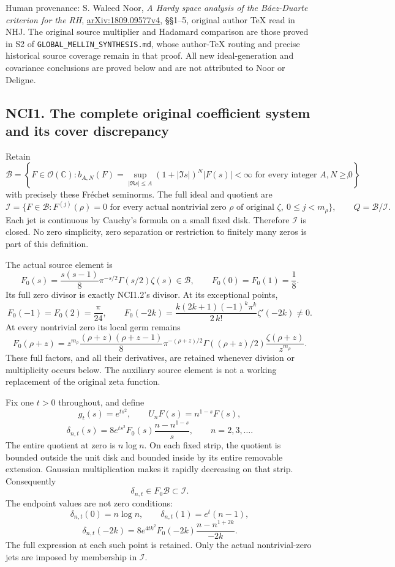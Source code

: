 Human provenance: S. Waleed Noor, \emph{A Hardy space analysis of the
Báez-Duarte criterion for the RH},
\href{https://arxiv.org/abs/1809.09577v4}{arXiv:1809.09577v4}, §§1--5,
original author TeX read in NHJ. The original source multiplier and
Hadamard comparison are those proved in S2 of
\texttt{GLOBAL\_MELLIN\_SYNTHESIS.md}, whose author-TeX routing and
precise historical source coverage remain in that proof. All new
ideal-generation and covariance conclusions are proved below and are not
attributed to Noor or Deligne.

\subsection{NCI1. The complete original coefficient system and its cover
discrepancy}\label{nci1.-the-complete-original-coefficient-system-and-its-cover-discrepancy}

Retain \[
\mathcal B=\left\{F\in\mathcal O(\mathbb C):
b_{A,N}(F)=\sup_{|\Re s|\le A}(1+|\Im s|)^N|F(s)|<\infty
\text{ for every integer }A,N\ge0\right\},
\tag{NCI1.1}
\] with precisely these Fréchet seminorms. The full ideal and quotient
are \[
\mathcal I=\{F\in\mathcal B:F^{(j)}(\rho)=0
\text{ for every actual nontrivial zero }\rho\text{ of original }\zeta,
\ 0\le j<m_\rho\},\qquad Q=\mathcal B/\mathcal I.
\tag{NCI1.2}
\] Each jet is continuous by Cauchy's formula on a small fixed disk.
Therefore \(\mathcal I\) is closed. No zero simplicity, zero separation
or restriction to finitely many zeros is part of this definition.

The actual source element is \[
F_0(s)=\frac{s(s-1)}8\pi^{-s/2}\Gamma(s/2)\zeta(s)\in\mathcal B,
\qquad F_0(0)=F_0(1)=\frac18.
\tag{NCI1.3}
\] Its full zero divisor is exactly NCI1.2's divisor. At its exceptional
points, \[
F_0(-1)=F_0(2)=\frac\pi{24},\qquad
F_0(-2k)=\frac{k(2k+1)(-1)^k\pi^k}{2\,k!}\zeta'(-2k)\ne0.
\tag{NCI1.4}
\] At every nontrivial zero its local germ remains \[
F_0(\rho+z)=z^{m_\rho}
\frac{(\rho+z)(\rho+z-1)}8\pi^{-(\rho+z)/2}
\Gamma((\rho+z)/2)\frac{\zeta(\rho+z)}{z^{m_\rho}}.
\tag{NCI1.5}
\] These full factors, and all their derivatives, are retained whenever
division or multiplicity occurs below. The auxiliary source element is
not a working replacement of the original zeta function.

Fix one \(t>0\) throughout, and define \[
g_t(s)=e^{ts^2},\qquad U_nF(s)=n^{1-s}F(s),
\] \[
\boxed{\delta_{n,t}(s)=8e^{ts^2}F_0(s)
\frac{n-n^{1-s}}s,\qquad n=2,3,\ldots.}
\tag{NCI1.6}
\] The entire quotient at zero is \(n\log n\). On each fixed strip, the
quotient is bounded outside the unit disk and bounded inside by its
entire removable extension. Gaussian multiplication makes it rapidly
decreasing on that strip. Consequently \[
\delta_{n,t}\in F_0\mathcal B\subset\mathcal I.
\tag{NCI1.7}
\] The endpoint values are not zero conditions: \[
\delta_{n,t}(0)=n\log n,\qquad
\delta_{n,t}(1)=e^t(n-1),
\] \[
\delta_{n,t}(-2k)=8e^{4tk^2}F_0(-2k)
\frac{n-n^{1+2k}}{-2k}.
\tag{NCI1.8}
\] The full expression at each such point is retained. Only the actual
nontrivial-zero jets are imposed by membership in \(\mathcal I\).

